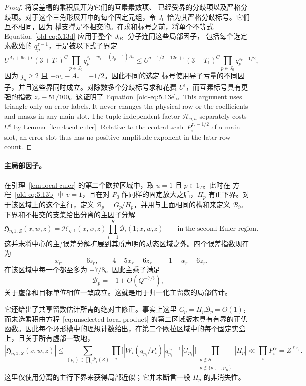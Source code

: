 \documentclass[11pt,a4paper]{article}
\numberwithin{equation}{section}
\numberwithin{figure}{section}
\theoremstyle{definition}
\theoremstyle{remark}
\begin{document}
\begin{proof}
将误差槽的乘积展开为它们的互素素数项、
已经受界的分歧项以及严格分歧项。对于这个三角形展开中的每个固定元组，令 $J_0$
恰为其严格分歧标号。它们互不相同，因为
槽支撑是不相交的。在求和标号之前，将单个不等式
Equation~\eqref{old-eq:5.13d} 应用于整个 $J_0$。分子连同这些局部因子，
包括每个选定素数处的 $q_p^{z-1}$，于是被以下式子界定
\[
 U^{A_*+6e+\epsilon}(3+T_1)^C
 \prod_{p\in J_0}q_p^{z_r-w_r-(j_p-1)A_*}
 \le U^{a-1/2+12e+\epsilon}(3+T_1)^C
       \prod_{p\in J_0}q_p^{z_r-1/2},
\]
因为 $j_p\ge2$ 且 $-w_r-A_*=-1/2$。因此不同的选定
标号使用导子亏量的不同因子，并且这些界同时成立。对除数多个分歧标号求和花费
$U^\epsilon$，而互素标号具有更强的指数
$z_r-51/100$。这证明了 Equation~\eqref{old-eq:5.13e}。This argument uses triangle only on error labels.  It never changes
the physical row or the coefficients and masks in any main slot.
The tuple-independent factor $\mathcal H_{\eta,u}$ separately costs
$U^\epsilon$ by Lemma~\ref{lem:local-euler}.  Relative to the
central scale $P_i^{z_r-1/2}$ of a main slot, an error slot thus
has no positive amplitude exponent in the later row count.
\end{proof}

\paragraph{主局部因子。}
在引理~\ref{lem:local-euler} 的第二个欧拉区域中，取
$u=1$ 且 $p\in1_T$。此时在
方程~\eqref{old-eq:5.13b} 中 $v=1$，且在对 $P_0$ 作同样的固定放大之后，$H_p$ 有正下界。对于该区域上的这个主行，定义 $\mathcal B_p=G_p/H_p$，并用与上面相同的槽和来定义 $\mathcal B_i$。下界和不相交的支集给出分离的主因子分解
\begin{equation}\label{eq:principal-slot-factorization}
 \mathfrak H_{\eta,1,Z}(x,w,z)
 =\mathcal H_{\eta,1}(x,w,z)\prod_{i=1}^K\mathcal B_i(1;x,w,z)
 \qquad\text{in the second Euler region}.
\end{equation}
这并未将中心的主/误差分解扩展到其所声明的动态区域之外。四个误差指数现在为
\[
 -x_r,\qquad -6z_r,\qquad 4-5x_r-6z_r,
       \qquad 1-w_r-6z_r.
\]
在该区域中每一个都至多为 $-7/8$。因此主乘子满足
\begin{equation}\label{eq:principal-local-approximation}
 \mathcal B_p=-1+O(Q^{-7/8}),
\end{equation}
关于虚部和目标单位相位一致成立。这就是用于归一化主留数的局部估计。

它还给出了共享留数估计所需的绝对主修正。事实上这里 $G_p=H_p\mathcal B_p=O(1)$，而未选乘积由方程~\eqref{eq:unselected-local-product} 的第二区域版本具有有界的正优函数。因此每个环形槽中的理想计数给出，在第二个欧拉区域中的每个固定实盒上，且关于所有虚部一致地，
\begin{equation}\label{eq:principal-local-tuple-bound}
 |\mathfrak H_{\eta,1,Z}(x,w,z)|
 \le\sum_{(p_i)\in\prod_i\mathcal P_i(Z)}
       \prod_i\bigl[|W_i(q_{p_i}/P_i)|q_{p_i}^{z_r-1}|G_{p_i}|\bigr]
       \prod_{\substack{p\notin S\\p\notin\{p_1,\ldots,p_K\}}}|H_p|
 \ll \prod_iP_i^{z_r}=Z^{\ell z_r}.
\end{equation}
这里仅使用分离的主行下界来获得局部近似；它并未断言一般 $H_p$ 的非消失性。
\end{document}
